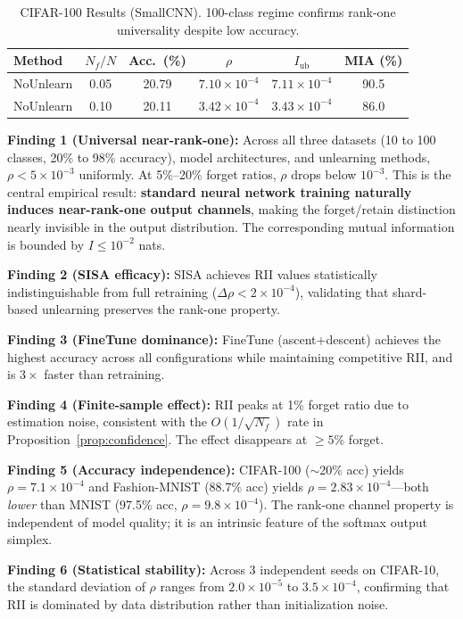 \documentclass[journal]{IEEEtran}
\theoremstyle{definition}
\begin{document}
\begin{table}[t]
\centering
\caption{CIFAR-100 Results (SmallCNN). 100-class regime confirms rank-one universality despite low accuracy.}\label{tab:cifar100}
\setlength{\tabcolsep}{3pt}
\begin{tabular}{l c c c c c}
\toprule
Method & $N_f/N$ & Acc.\ (\%) & $\rho$ & $I_{\mathrm{ub}}$ & MIA (\%) \\
\midrule
NoUnlearn  & 0.05 & 20.79 & $7.10{\times}10^{-4}$ & $7.11{\times}10^{-4}$ & 90.5 \\
NoUnlearn  & 0.10 & 20.11 & $3.42{\times}10^{-4}$ & $3.43{\times}10^{-4}$ & 86.0 \\
\bottomrule
\end{tabular}
\end{table}

\textbf{Finding 1 (Universal near-rank-one):} Across all three datasets (10 to 100 classes, 20\% to 98\% accuracy), model architectures, and unlearning methods, $\rho < 5 \times 10^{-3}$ uniformly. At 5\%--20\% forget ratios, $\rho$ drops below $10^{-3}$. This is the central empirical result: \textbf{standard neural network training naturally induces near-rank-one output channels}, making the forget/retain distinction nearly invisible in the output distribution. The corresponding mutual information is bounded by $I \le 10^{-2}$ nats.

\textbf{Finding 2 (SISA efficacy):} SISA achieves RII values statistically indistinguishable from full retraining ($\Delta\rho < 2\times 10^{-4}$), validating that shard-based unlearning preserves the rank-one property.

\textbf{Finding 3 (FineTune dominance):} FineTune (ascent+descent) achieves the highest accuracy across all configurations while maintaining competitive RII, and is $3\times$ faster than retraining.

\textbf{Finding 4 (Finite-sample effect):} RII peaks at 1\% forget ratio due to estimation noise, consistent with the $O(1/\sqrt{N_f})$ rate in Proposition~\ref{prop:confidence}. The effect disappears at $\ge 5\%$ forget.

\textbf{Finding 5 (Accuracy independence):} CIFAR-100 ($\sim$20\% acc) yields $\rho = 7.1 \times 10^{-4}$ and Fashion-MNIST (88.7\% acc) yields $\rho = 2.83 \times 10^{-4}$---both \emph{lower} than MNIST (97.5\% acc, $\rho = 9.8 \times 10^{-4}$). The rank-one channel property is independent of model quality; it is an intrinsic feature of the softmax output simplex.

\textbf{Finding 6 (Statistical stability):} Across 3 independent seeds on CIFAR-10, the standard deviation of $\rho$ ranges from $2.0\times 10^{-5}$ to $3.5\times 10^{-4}$, confirming that RII is dominated by data distribution rather than initialization noise.
\end{document}
